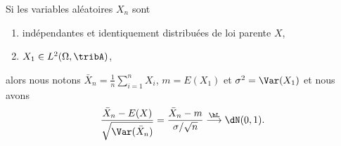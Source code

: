 \begin{theorem}     \label{ThoOWodAi}
    Si les variables aléatoires \( X_n\) sont
    \begin{enumerate}
        \item
            indépendantes et identiquement distribuées de loi parente \( X\),
        \item
            \( X_1\in L^2(\Omega,\tribA)\),
    \end{enumerate}
    alors nous notons \( \bar X_n=\frac{1}{ n }\sum_{i=1}^{n}X_i\), \( m=E(X_1)\) et \( \sigma^2=\Var(X_1)\) et nous avons
    \begin{equation}
        \frac{ \bar X_n-E(X) }{ \sqrt{\Var(\bar X_n)} }=\frac{ \bar X_n-m }{ \sigma/\sqrt{n} }\stackrel{\hL}{\longrightarrow}\dN(0,1).
    \end{equation}
\end{theorem}

